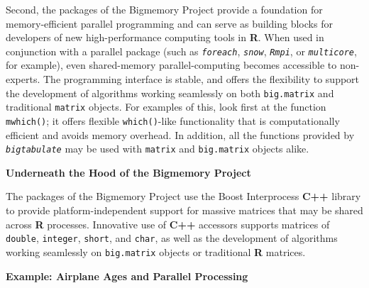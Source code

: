 \documentclass[12pt]{article}
\newcommand{\proglang}[1]{\textbf{#1}}
\newcommand{\pkg}[1]{\texttt{\textsl{#1}}}
\begin{document}
Second, the packages of the Bigmemory Project provide a foundation for
memory-efficient parallel programming and can serve as building blocks
for developers of new high-performance computing tools in \proglang{R}.
When used in conjunction with a parallel package (such as \pkg{foreach},
\pkg{snow}, \pkg{Rmpi}, or \pkg{multicore}, for example),
even shared-memory parallel-computing becomes
accessible to non-experts.  
The programming interface is stable, and offers the flexibility to support
the development of
algorithms working seamlessly on both \texttt{big.matrix} and traditional
\texttt{matrix} objects.  For examples of this, look first
at the function \texttt{mwhich()}; it offers flexible \texttt{which()}-like
functionality that is computationally efficient and avoids memory overhead.
In addition, all the functions provided by \pkg{bigtabulate} may be used
with \texttt{matrix} and \texttt{big.matrix} objects alike.

\vspace*{0.5cm}
\noindent
{\bf Underneath the Hood of the Bigmemory Project}
\vspace*{0.5cm}

The packages of the Bigmemory Project use the Boost Interprocess
\proglang{C++} library to provide platform-independent support for
massive matrices that may be shared across \proglang{R} processes.
Innovative use of \proglang{C++} accessors supports matrices of
\texttt{double}, \texttt{integer}, \texttt{short}, and \texttt{char},
as well as the development of algorithms working seamlessly on
\texttt{big.matrix} objects or traditional \proglang{R} matrices.

\vspace*{0.5cm}
\noindent
{\bf Example: Airplane Ages and Parallel Processing}
\vspace*{0.5cm}
\end{document}
